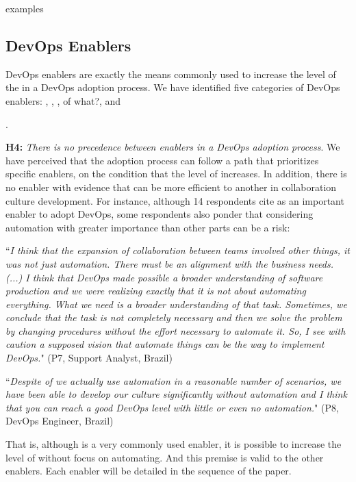 {\color{red}examples} 

\subsection{DevOps Enablers}

DevOps enablers are exactly the means commonly used to increase the level of 
the  in a DevOps adoption process. 
We have identified five categories of DevOps enablers: 
, , ,
 {\color{red}of what?}, and {. 

\textbf{H4:} \textit{There is no precedence between enablers in a DevOps
adoption process}. We have perceived that the adoption process can follow a
path that prioritizes specific enablers, on the condition that the level of
 increases. In addition, there is no enabler with evidence that
can be more efficient to another in collaboration culture development. For
instance, although 14 respondents cite  as an important
enabler to adopt DevOps, some respondents also ponder that considering
automation with greater importance than other parts can be a risk:

\begin{mq}
``\emph{I think that the expansion of collaboration between teams involved other
things, it was not just automation. There must be an alignment with the
business needs. (...) I think that DevOps made possible a broader understanding
of software production and we were realizing exactly that it is not about
automating everything. What we need is a broader understanding of that task.
Sometimes, we conclude that the task is not completely necessary and then we
solve the problem by changing procedures without the effort necessary to
automate it. So, I see with caution a supposed vision that automate things can
be the way to implement DevOps.}" (P7, Support Analyst, Brazil)
\end{mq}

\begin{mq}
``\emph{Despite of we actually use automation in a reasonable number of scenarios, we have been able to develop our culture significantly without automation and I think that you can reach a good DevOps level with little or even no automation.}" (P8, DevOps Engineer, Brazil)
\end{mq}

That is, although  is a very commonly used enabler, it is possible to
increase the level of  without focus on automating. And
this premise is valid to the other enablers. {\color{red}Each enabler will be detailed in
the sequence of the paper}.

}
